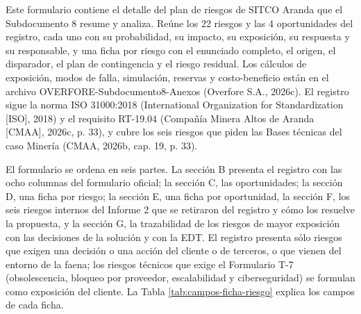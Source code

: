 \documentclass[formulario]{../../comun/overfore}
\begin{document}
Este formulario contiene el detalle del plan de riesgos de SITCO Aranda que el Subdocumento 8 resume y analiza. Reúne los 22 riesgos y las 4 oportunidades del registro, cada uno con su probabilidad, su impacto, su exposición, su respuesta y su responsable, y una ficha por riesgo con el enunciado completo, el origen, el disparador, el plan de contingencia y el riesgo residual. Los cálculos de exposición, modos de falla, simulación, reservas y costo-beneficio están en el archivo OVERFORE-Subdocumento8-Anexos (Overfore S.A., 2026c). El registro sigue la norma ISO 31000:2018 (International Organization for Standardization [ISO], 2018) y el requisito RT-19.04 (Compañía Minera Altos de Aranda [CMAA], 2026c, p. 33), y cubre los seis riesgos que piden las Bases técnicas del caso Minería (CMAA, 2026b, cap. 19, p. 33).

El formulario se ordena en seis partes. La sección B presenta el registro con las ocho columnas del formulario oficial; la sección C, las oportunidades; la sección D, una ficha por riesgo; la sección E, una ficha por oportunidad, la sección F, los seis riesgos internos del Informe 2 que se retiraron del registro y cómo los resuelve la propuesta, y la sección G, la trazabilidad de los riesgos de mayor exposición con las decisiones de la solución y con la EDT. El registro presenta sólo riesgos que exigen una decisión o una acción del cliente o de terceros, o que vienen del entorno de la faena; los riesgos técnicos que exige el Formulario T-7 (obsolescencia, bloqueo por proveedor, escalabilidad y ciberseguridad) se formulan como exposición del cliente. La Tabla \ref{tab:campos-ficha-riesgo} explica los campos de cada ficha.
\end{document}
